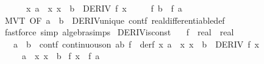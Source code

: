 \begin{isabellebody}
\ \ \ \ \ {}{\isacharcolon}{\kern0pt}\ {\isachardoublequoteopen}{\isasymAnd}x{\isachardot}{\kern0pt}\ {\isasymlbrakk}a\ {\isacharless}{\kern0pt}\ x{\isacharsemicolon}{\kern0pt}\ x\ {\isacharless}{\kern0pt}\ b{\isasymrbrakk}\ {\isasymLongrightarrow}\ DERIV\ f\ x\ {\isacharcolon}{\kern0pt}{\isachargreater}{\kern0pt}\ {}{\isachardoublequoteclose}\isanewline
\ \ \ {\isachardoublequoteopen}f\ b\ {\isacharequal}{\kern0pt}\ f\ a{\isachardoublequoteclose}\isanewline
%
\isadelimproof
\ \ %
\endisadelimproof
%
\isatagproof
{}\isamarkupfalse%
\ MVT\ {\isacharbrackleft}{\kern0pt}OF\ {\isacartoucheopen}a\ {\isacharless}{\kern0pt}\ b{\isacartoucheclose}{\isacharbrackright}{\kern0pt}\ {\isachardoublequoteopen}{}{\isachardoublequoteclose}\ DERIV{\isacharunderscore}{\kern0pt}unique\ contf\ real{\isacharunderscore}{\kern0pt}differentiable{\isacharunderscore}{\kern0pt}def\isanewline
\ \ \isamarkupfalse%
\ {\isacharparenleft}{\kern0pt}fastforce\ simp{\isacharcolon}{\kern0pt}\ algebra{\isacharunderscore}{\kern0pt}simps{\isacharparenright}{\kern0pt}%
\endisatagproof
{\isafoldproof}%
%
\isadelimproof
\isanewline
%
\endisadelimproof
\isanewline
{}\isamarkupfalse%
\ DERIV{\isacharunderscore}{\kern0pt}isconst{}{\isacharcolon}{\kern0pt}\isanewline
\ \ \ f\ {\isacharcolon}{\kern0pt}{\isacharcolon}{\kern0pt}\ {\isachardoublequoteopen}real\ {\isasymRightarrow}\ real{\isachardoublequoteclose}\isanewline
\ \ \ {\isachardoublequoteopen}a\ {\isacharless}{\kern0pt}\ b{\isachardoublequoteclose}\ \ contf{\isacharcolon}{\kern0pt}\ {\isachardoublequoteopen}continuous{\isacharunderscore}{\kern0pt}on\ {\isacharbraceleft}{\kern0pt}a{\isachardot}{\kern0pt}{\isachardot}{\kern0pt}b{\isacharbraceright}{\kern0pt}\ f{\isachardoublequoteclose}\ \ derf{\isacharcolon}{\kern0pt}\ {\isachardoublequoteopen}{\isasymAnd}x{\isachardot}{\kern0pt}\ {\isasymlbrakk}a\ {\isacharless}{\kern0pt}\ x{\isacharsemicolon}{\kern0pt}\ x\ {\isacharless}{\kern0pt}\ b{\isasymrbrakk}\ {\isasymLongrightarrow}\ DERIV\ f\ x\ {\isacharcolon}{\kern0pt}{\isachargreater}{\kern0pt}\ {}{\isachardoublequoteclose}\isanewline
\ \ \ \ \ {\isachardoublequoteopen}a\ {\isasymle}\ x{\isachardoublequoteclose}\ {\isachardoublequoteopen}x\ {\isasymle}\ b{\isachardoublequoteclose}\isanewline
{}\ {\isachardoublequoteopen}f\ x\ {\isacharequal}{\kern0pt}\ f\ a{\isachardoublequoteclose}\isanewline
%
\isadelimproof

\end{isabellebody}
